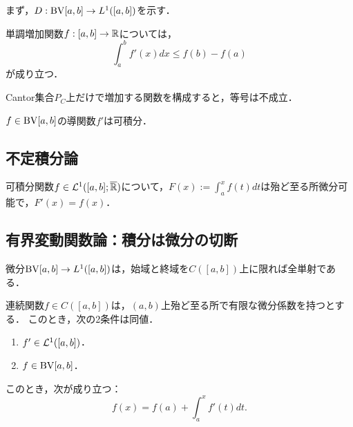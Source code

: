 \documentclass[uplatex, dvipdfmx]{jsreport}
\begin{document}
\begin{tcolorbox}[colframe=ForestGreen, colback=ForestGreen!10!white,breakable,colbacktitle=ForestGreen!40!white,coltitle=black,fonttitle=\bfseries\sffamily,
title=]
    まず，$D:\mathrm{BV}[a,b]\to L^1([a,b])$を示す．
\end{tcolorbox}

\begin{theorem}[Lebesgue]
    単調増加関数$f:[a,b]\to\mathbb{R}$については，
    \[\int^b_af'(x)dx\le f(b)-f(a)\]
    が成り立つ．
\end{theorem}

\begin{example}
    Cantor集合$P_C$上だけで増加する関数を構成すると，等号は不成立．
\end{example}

\begin{corollary}
    $f\in\mathrm{BV}[a,b]$の導関数$f'$は可積分．
\end{corollary}

\subsection{不定積分論}

\begin{theorem}[Lebesgue (1904)]
    可積分関数$f\in\mathcal{L}^1([a,b];\overline{\mathbb{R}})$について，$F(x):=\int^x_af(t)dt$は殆ど至る所微分可能で，$F'(x)=f(x)$．
\end{theorem}

\subsection{有界変動関数論：積分は微分の切断}

\begin{tcolorbox}[colframe=ForestGreen, colback=ForestGreen!10!white,breakable,colbacktitle=ForestGreen!40!white,coltitle=black,fonttitle=\bfseries\sffamily,
title=]
    微分$\mathrm{BV}[a,b]\to L^1([a,b])$は，始域と終域を$C([a,b])$上に限れば全単射である．
\end{tcolorbox}

\begin{theorem}[Lebesgue (1902)]\label{thm-Lebesgue-BV-and-L1}
    連続関数$f\in C([a,b])$は，$(a,b)$上殆ど至る所で有限な微分係数を持つとする．
    このとき，次の2条件は同値．
    \begin{enumerate}
        \item $f'\in\mathcal{L}^1([a,b])$．
        \item $f\in\mathrm{BV}[a,b]$．
    \end{enumerate}
    このとき，次が成り立つ：
    \[f(x)=f(a)+\int^x_af'(t)dt.\]
\end{theorem}
\end{document}
